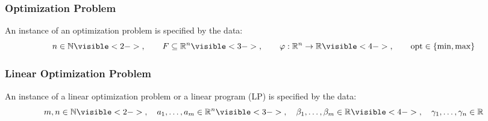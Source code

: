 \begin{frame}
    \frametitle{Optimization Problem}
    \begin{definition}
        An instance of an \alert{optimization problem} is specified by the data:
        \begin{equation*}
            n \in \mathbb{N}
            \visible<2->{, \qquad F \subseteq \mathbb{R}^n}
            \visible<3->{, \qquad \varphi: \mathbb{R}^n \to \mathbb{R}}
            \visible<4->{, \qquad \text{opt} \in \{\min, \max \}}
        \end{equation*}
    \end{definition}
\end{frame}

\begin{frame}
    \frametitle{Linear Optimization Problem}
    \begin{definition}
        An instance of a \alert{linear optimization problem} or a \alert{linear program (LP)} is specified by the data:
        \begin{equation*}
            m, n \in \mathbb{N}
            \visible<2->{, \quad a_1, \dots, a_m \in \mathbb{R}^n}
            \visible<3->{, \quad \beta_1, \dots, \beta_m \in \mathbb{R}}
            \visible<4->{, \quad \gamma_1, \dots, \gamma_n \in \mathbb{R}}
        \end{equation*}
    \end{definition}
\end{frame}

